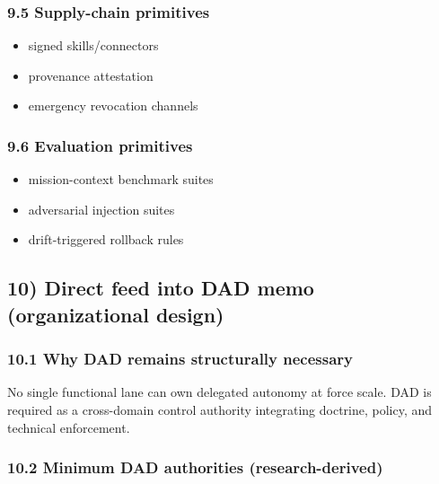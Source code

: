 \documentclass[
]{article}
\providecommand{\tightlist}{%
  \setlength{\itemsep}{0pt}\setlength{\parskip}{0pt}}
\begin{document}
\hypertarget{supply-chain-primitives}{%
\subsubsection{9.5 Supply-chain
primitives}\label{supply-chain-primitives}}

\begin{itemize}
\tightlist
\item
  signed skills/connectors
\item
  provenance attestation
\item
  emergency revocation channels
\end{itemize}

\hypertarget{evaluation-primitives}{%
\subsubsection{9.6 Evaluation primitives}\label{evaluation-primitives}}

\begin{itemize}
\tightlist
\item
  mission-context benchmark suites
\item
  adversarial injection suites
\item
  drift-triggered rollback rules
\end{itemize}

\hypertarget{direct-feed-into-dad-memo-organizational-design}{%
\subsection{10) Direct feed into DAD memo (organizational
design)}\label{direct-feed-into-dad-memo-organizational-design}}

\hypertarget{why-dad-remains-structurally-necessary}{%
\subsubsection{10.1 Why DAD remains structurally
necessary}\label{why-dad-remains-structurally-necessary}}

No single functional lane can own delegated autonomy at force scale. DAD
is required as a cross-domain control authority integrating doctrine,
policy, and technical enforcement.

\hypertarget{minimum-dad-authorities-research-derived}{%
\subsubsection{10.2 Minimum DAD authorities
(research-derived)}\label{minimum-dad-authorities-research-derived}}
\end{document}
